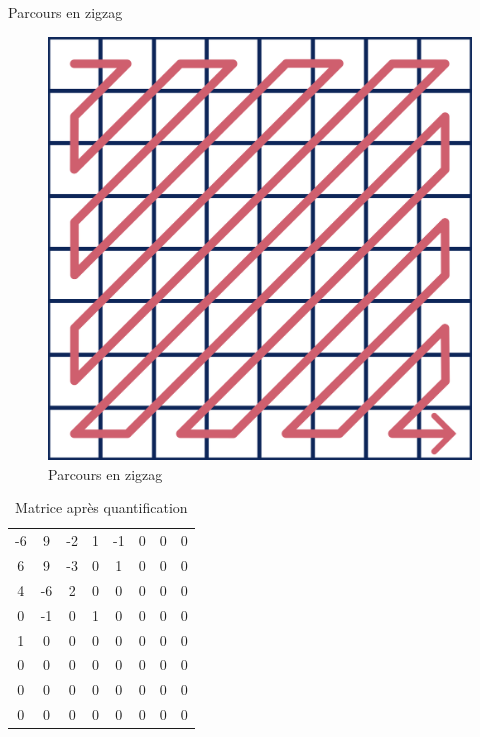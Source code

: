 \documentclass[xcolor=dvipsnames]{beamer}
\begin{document}
\begin{frame} {Parcours en zigzag}
    \hfill
    \begin{minipage}{0.35\textwidth}
        \centering
        \begin{figure}
            \centering
            \includegraphics[width=0.9\linewidth]{zigzag2.png}
            \caption{\centering Parcours en zigzag}
        \end{figure}
    \end{minipage}
    \hfill
    \begin{minipage}{0.05\textwidth}
    \end{minipage}
    \hfill
    \begin{minipage}{0.45\textwidth}
        \centering
        \begin{table}
            \tiny 
            \centering
            \setlength{\tabcolsep}{2pt} %
            \renewcommand{\arraystretch}{1.25} %
            \begin{tabular}{cccccccc}
                -6 & 9 & -2 & 1 & -1 & 0 & 0 & 0 \\
                6 & 9 & -3 & 0 & 1 & 0 & 0 & 0 \\
                4 & -6 & 2 & 0 & 0 & 0 & 0 & 0 \\
                0 & -1 & 0 & 1 & 0 & 0 & 0 & 0 \\
                1 & 0 & 0 & 0 & 0 & 0 & 0 & 0 \\
                0 & 0 & 0 & 0 & 0 & 0 & 0 & 0 \\
                0 & 0 & 0 & 0 & 0 & 0 & 0 & 0 \\
                0 & 0 & 0 & 0 & 0 & 0 & 0 & 0 \\
            \end{tabular}
            \caption{\centering Matrice après quantification }
        \end{table}
        

\end{minipage}
\end{frame}
\end{document}

